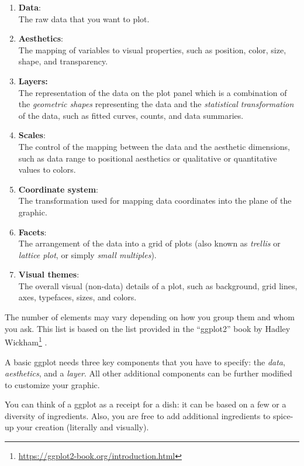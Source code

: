 \documentclass[
]{krantz}
\providecommand{\tightlist}{%
  \setlength{\itemsep}{0pt}\setlength{\parskip}{0pt}}
\renewcommand{\href}[2]{#2\footnote{\url{#1}}}
\begin{document}
\begin{enumerate}
\def\labelenumi{\arabic{enumi}.}
\tightlist
\item
  \textbf{Data}:\\
  The raw data that you want to plot.
\item
  \textbf{Aesthetics}:\\
  The mapping of variables to visual properties, such as position, color, size, shape, and transparency.
\item
  \textbf{Layers:}\\
  The representation of the data on the plot panel which is a combination of the \emph{geometric shapes} representing the data and the \emph{statistical transformation} of the data, such as fitted curves, counts, and data summaries.
\item
  \textbf{Scales}:\\
  The control of the mapping between the data and the aesthetic dimensions, such as data range to positional aesthetics or qualitative or quantitative values to colors.
\item
  \textbf{Coordinate system}:\\
  The transformation used for mapping data coordinates into the plane of the graphic.
\item
  \textbf{Facets}:\\
  The arrangement of the data into a grid of plots (also known as \emph{trellis} or \emph{lattice plot}, or simply \emph{small multiples}).
\item
  \textbf{Visual themes}:\\
  The overall visual (non-data) details of a plot, such as background, grid lines, axes, typefaces, sizes, and colors.
\end{enumerate}

The number of elements may vary depending on how you group them and whom you ask. This list is based on the list provided in the \href{https://ggplot2-book.org/introduction.html}{``ggplot2'' book by Hadley Wickham} \citep{ggplot2}.

A basic ggplot needs three key components that you have to specify: the \emph{data}, \emph{aesthetics}, and a \emph{layer}. All other additional components can be further modified to customize your graphic.

You can think of a ggplot as a receipt for a dish: it can be based on a few or a diversity of ingredients. Also, you are free to add additional ingredients to spice-up your creation (literally and visually).
\end{document}
